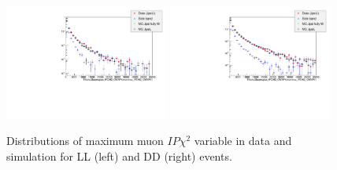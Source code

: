 \begin{figure}[h!]
\centering
\includegraphics[width=0.48\textwidth]{Lmumu/figs/MC_data_comp/Maxmuplus_IPCHI2_OWNPVmuminus_IPCHI2_OWNPV_plotLL.pdf}
\includegraphics[width=0.48\textwidth]{Lmumu/figs/MC_data_comp/Maxmuplus_IPCHI2_OWNPVmuminus_IPCHI2_OWNPV_plotDD.pdf}
\caption{ Distributions of maximum muon $IP\chi^2$ variable in data and simulation for LL (left) and DD (right) events.   }
\end{figure}








